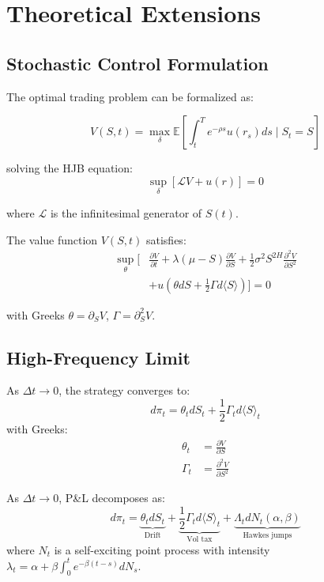 \documentclass[12pt]{article}
\begin{document}
\section{Theoretical Extensions}

\subsection{Stochastic Control Formulation}

The optimal trading problem can be formalized as:

\begin{equation}
V(S,t) = \max_{\delta} \mathbb{E}\left[ \int_t^T e^{-\rho s} u(r_s) ds \;\bigg|\; S_t = S \right]
\end{equation}

solving the HJB equation:
\begin{equation}
\sup_{\delta} \left[ \mathcal{L}V + u(r) \right] = 0
\end{equation}

where $\mathcal{L}$ is the infinitesimal generator of $S(t)$.

The value function $V(S,t)$ satisfies:
\begin{align}
\sup_{\theta} \bigg[ & \frac{\partial V}{\partial t} + \lambda(\mu - S)\frac{\partial V}{\partial S} + \frac{1}{2}\sigma^2 S^{2H}\frac{\partial^2 V}{\partial S^2} \\
& + u\left(\theta dS + \frac{1}{2}\Gamma d\langle S\rangle\right) \bigg] = 0 \nonumber
\end{align}

with Greeks $\theta = \partial_S V$, $\Gamma = \partial^2_S V$.

\subsection{High-Frequency Limit}

As $\Delta t \to 0$, the strategy converges to:
\begin{equation}
d\pi_t = \theta_t dS_t + \frac{1}{2} \Gamma_t d\langle S \rangle_t
\end{equation}
with Greeks:
\begin{align}
\theta_t &= \frac{\partial V}{\partial S} \\
\Gamma_t &= \frac{\partial^2 V}{\partial S^2}
\end{align}

As $\Delta t \to 0$, P\&L decomposes as:
\begin{equation}
d\pi_t = \underbrace{\theta_t dS_t}_{\text{Drift}} + \underbrace{\frac{1}{2}\Gamma_t d\langle S\rangle_t}_{\text{Vol tax}} + \underbrace{\Lambda_t dN_t(\alpha,\beta)}_{\text{Hawkes jumps}}
\end{equation}
where $N_t$ is a self-exciting point process with intensity $\lambda_t = \alpha + \beta \int_0^t e^{-\beta(t-s)}dN_s$.
\end{document}
